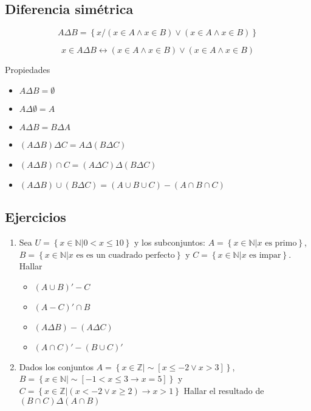 \documentclass[16pt,]{krantz}
\providecommand{\tightlist}{%
  \setlength{\itemsep}{0pt}\setlength{\parskip}{0pt}}
\theoremstyle{definition}
\theoremstyle{definition}
\theoremstyle{definition}
\theoremstyle{definition}
\theoremstyle{remark}
\begin{document}
\hypertarget{diferencia-simuxe9trica}{%
\subsection{Diferencia simétrica}\label{diferencia-simuxe9trica}}

\[
A\Delta B=\left\{x/(x\in A\wedge x\in B)\vee (x\in A\wedge x\in B)\right\}
\]

\[
x\in A\Delta B\leftrightarrow (x\in A\wedge x\in B)\vee (x\in A\wedge x\in B)
\]

Propiedades

\begin{itemize}
\tightlist
\item
  \(A\Delta B=\emptyset\)
\item
  \(A\Delta \emptyset=A\)
\item
  \(A\Delta B=B\Delta A\)
\item
  \((A\Delta B)\Delta C=A\Delta(B\Delta C)\)
\item
  \((A\Delta B)\cap C=(A\Delta C)\Delta(B\Delta C)\)
\item
  \((A\Delta B)\cup(B\Delta C)=(A\cup B\cup C)-(A\cap B\cap C)\)
\end{itemize}

\hypertarget{ejercicios}{%
\subsection{Ejercicios}\label{ejercicios}}

\begin{enumerate}
\def\labelenumi{\arabic{enumi}.}
\item
  Sea \(U=\left\{x\in\mathbb{N}|0<x\leq 10\right\}\) y los subconjuntos: \(A=\left\{x\in\mathbb{N}|x \text{ es primo}\right\}\), \(B=\left\{x\in\mathbb{N}| x\text{ es es un cuadrado perfecto}\right\}\) y \(C=\left\{x\in\mathbb{N}|x\text{ es impar}\right\}\). Hallar

  \begin{itemize}
  \tightlist
  \item
    \((A\cup B)'-C\)
  \item
    \((A-C)'\cap B\)
  \item
    \((A\Delta B)-(A\Delta C)\)
  \item
    \((A\cap C)'-(B\cup C)'\)
  \end{itemize}
\item
  Dados los conjuntos \(A=\left\{x\in\mathbb{Z}|\sim[x\leq -2\vee x>3]\right\}\), \(B=\left\{x\in\mathbb{N}|\sim[-1<x\leq 3 \rightarrow x=5]\right\}\) y \(C=\left\{x\in\mathbb{Z}|(x< -2\vee x\geq 2)\rightarrow x>1\right\}\) Hallar el resultado de \((B\cap C)\Delta(A\cap B)\)
\end{enumerate}
\end{document}
